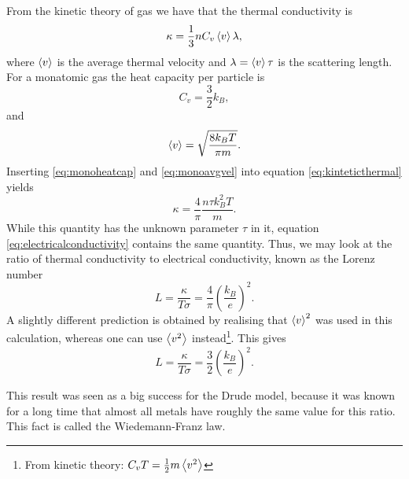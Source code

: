 \documentclass[11pt]{amsart}
\begin{document}
From the kinetic theory of gas we have that the thermal conductivity is
\begin{equation}
\label{eq:kinteticthermal}
\kappa = \frac{1}{3} n C_v \ev{v} \lambda,
\end{equation}
where $\ev{v}$ is the average thermal velocity and  $\lambda = \ev{v} \tau$ is the scattering length. For a monatomic gas the heat capacity per particle is
\begin{equation}
\label{eq:monoheatcap}
C_v = \frac{3}{2}k_B, 
\end{equation}
and 
\begin{equation}
\label{eq:monoavgvel}
\ev{v} = \sqrt{\frac{8k_BT}{\pi m}}.
\end{equation}
Inserting \ref{eq:monoheatcap} and \ref{eq:monoavgvel} into equation \ref{eq:kinteticthermal} yields
\begin{equation}
\kappa = \frac{4}{\pi} \frac{n\tau k_B^2T}{m}.
\end{equation}
While this quantity has the unknown parameter $\tau$ in it, equation \ref{eq:electricalconductivity} contains the same quantity. Thus, we may look at the ratio of thermal conductivity to electrical conductivity,
known as the Lorenz number
\begin{equation}
L = \frac{\kappa}{T\sigma} = \frac{4}{\pi}\left(\frac{k_B}{e} \right)^2.
\end{equation}
A slightly different prediction is obtained by realising that $\ev{v}^2$ was used in this calculation, whereas one can use $\ev{v^2}$ instead\footnote{From kinetic theory: $C_v T = \frac{1}{2}m\ev{v^2}$}. This gives
\begin{equation}
\label{eq:durderesult2}
L = \frac{\kappa}{T\sigma} = \frac{3}{2} \left(\frac{k_B}{e} \right)^2.
\end{equation}

This result was seen as a big success for the Drude model, because it was known for a long time that almost all metals have roughly the same value for this ratio. This fact is called the Wiedemann-Franz law.
\end{document}

